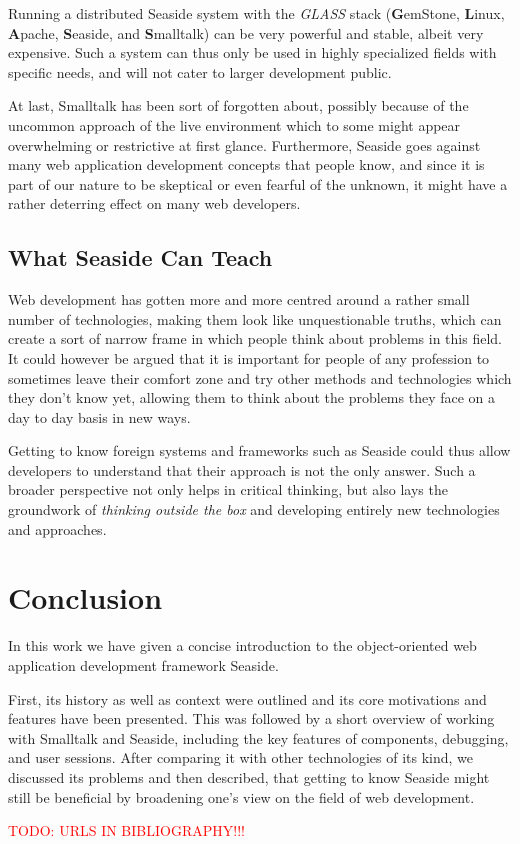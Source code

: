 \documentclass[a4paper,12pt,pagesize,headsepline,oribibl,titlepage]{scrartcl}
\newcommand{\todo}[1]{\textcolor{red}{TODO: #1}\PackageWarning{TODO:}{#1!}}
\begin{document}
Running a distributed Seaside system with the \emph{GLASS} stack (\textbf{G}emStone, \textbf{L}inux, \textbf{A}pache, \textbf{S}easide, and \textbf{S}malltalk) can be very powerful and stable, albeit very expensive. Such a system can thus only be used in highly specialized fields with specific needs, and will not cater to larger development public.

At last, Smalltalk has been sort of forgotten about, possibly because of the uncommon approach of the live environment which to some might appear overwhelming or restrictive at first glance. Furthermore, Seaside goes against many web application development concepts that people know, and since it is part of our nature to be skeptical or even fearful of the unknown, it might have a rather deterring effect on many web developers.


\subsection{What Seaside Can Teach}

Web development has gotten more and more centred around a rather small number of technologies, making them look like unquestionable truths, which can create a sort of narrow frame in which people think about problems in this field. 
It could however be argued that it is important for people of any profession to sometimes leave their comfort zone and try other methods and technologies which they don't know yet, allowing them to think about the problems they face on a day to day basis in new ways.

Getting to know foreign systems and frameworks such as Seaside could thus allow developers to understand that their approach is not the only answer. Such a broader perspective not only helps in critical thinking, but also lays the groundwork of \emph{thinking outside the box} and developing entirely new technologies and approaches.

\section{Conclusion}
\label{sec:conclusion}

In this work we have given a concise introduction to the object-oriented web application development framework Seaside. 

First, its history as well as context were outlined and its core motivations and features have been presented. This was followed by a short overview of working with Smalltalk and Seaside, including the key features of components, debugging, and user sessions. After comparing it with other technologies of its kind, we discussed its problems and then described, that getting to know Seaside might still be beneficial by broadening one's view on the field of web development.

\todo{URLS IN BIBLIOGRAPHY!!!}

\newpage
\nocite{*}


\end{document}
